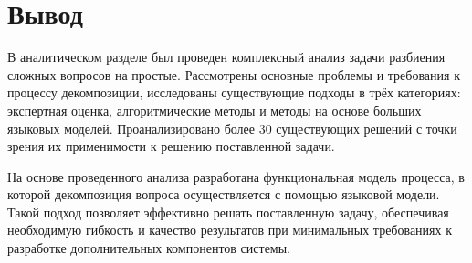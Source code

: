 \section{Вывод}

В аналитическом разделе был проведен комплексный анализ задачи разбиения сложных вопросов на простые. Рассмотрены основные проблемы и требования к процессу декомпозиции, исследованы существующие подходы в трёх категориях: экспертная оценка, алгоритмические методы и методы на основе больших языковых моделей. Проанализировано более 30 существующих решений с точки зрения их применимости к решению поставленной задачи.

На основе проведенного анализа разработана функциональная модель процесса, в которой декомпозиция вопроса осуществляется с помощью языковой модели. Такой подход позволяет эффективно решать поставленную задачу, обеспечивая необходимую гибкость и качество результатов при минимальных требованиях к разработке дополнительных компонентов системы.